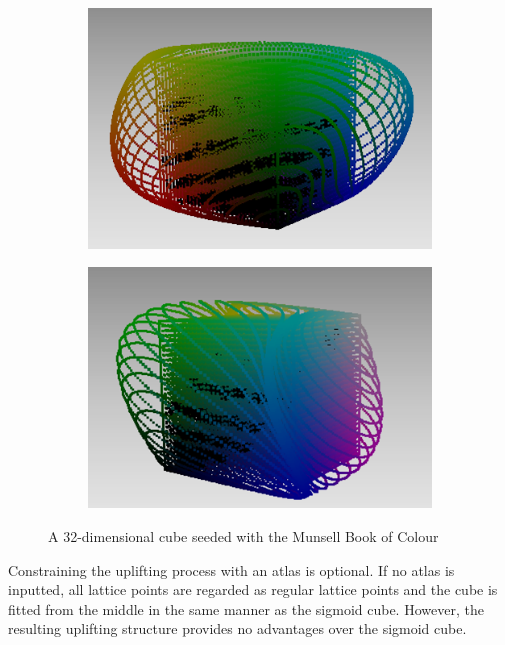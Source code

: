 \begin{figure}[t!]
\begin{subfigure}[t]{0.22\textwidth}
		\includegraphics[width=\linewidth]{img/seededCube_mcb3.png}
		\label{fig:seededCube_mcb3}
	\end{subfigure} \hspace{0.05em}
	\begin{subfigure}[t]{0.22\textwidth}
		\includegraphics[width=\linewidth]{img/seededCube_mcb4.png}
		\label{fig:seededCube_mcb4}
	\end{subfigure}
	\caption{A 32-dimensional cube seeded with the Munsell Book of Colour}
	\label{fig:seededCubeMCB}
\end{figure}

Constraining the uplifting process with an atlas is optional. If no atlas is inputted, all lattice points are regarded as regular lattice points and the cube is fitted from the middle in the same manner as the sigmoid cube. However, the resulting uplifting structure provides no advantages over the sigmoid cube.




